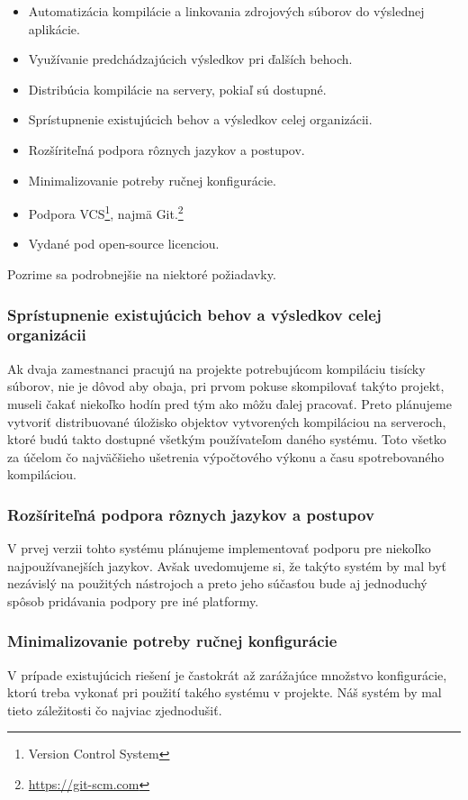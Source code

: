 \begin{itemize}
  \item Automatizácia kompilácie a linkovania zdrojových súborov do výslednej aplikácie.
  \item Využívanie predchádzajúcich výsledkov pri ďalších behoch.
  \item Distribúcia kompilácie na servery, pokiaľ sú dostupné.
  \item Sprístupnenie existujúcich behov a výsledkov celej organizácii.
  \item Rozšíriteľná podpora rôznych jazykov a postupov.
  \item Minimalizovanie potreby ručnej konfigurácie.
  \item Podpora VCS\footnote{Version Control System}, najmä Git.\footnote{\url{https://git-scm.com}}
  \item Vydané pod open-source licenciou.
\end{itemize}

Pozrime sa podrobnejšie na niektoré požiadavky.

\subsubsection{Sprístupnenie existujúcich behov a výsledkov celej organizácii}
Ak dvaja zamestnanci pracujú na projekte potrebujúcom kompiláciu tisícky súborov,
nie je dôvod aby obaja, pri prvom pokuse skompilovať takýto projekt, museli čakať
niekoľko hodín pred tým ako môžu ďalej pracovať. Preto plánujeme vytvoriť distribuované
úložisko objektov vytvorených kompiláciou na serveroch, ktoré budú takto dostupné
všetkým používateľom daného systému. Toto všetko za účelom čo najväčšieho ušetrenia
výpočtového výkonu a času spotrebovaného kompiláciou.

\subsubsection{Rozšíriteľná podpora rôznych jazykov a postupov}
V prvej verzii tohto systému plánujeme implementovať podporu pre niekoľko najpoužívanejších
jazykov. Avšak uvedomujeme si, že takýto systém by mal byť nezávislý na použitých
nástrojoch a preto jeho súčasťou bude aj jednoduchý spôsob pridávania podpory
pre iné platformy.

\subsubsection{Minimalizovanie potreby ručnej konfigurácie}
V prípade existujúcich riešení je častokrát až zarážajúce množstvo konfigurácie,
ktorú treba vykonať pri použití takého systému v projekte. Náš systém by mal
tieto záležitosti čo najviac zjednodušiť.


